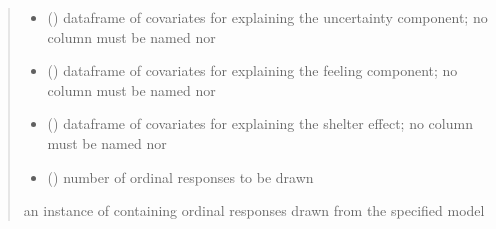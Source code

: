 \documentclass[letterpaper,10pt,english]{sphinxmanual}
\begin{document}
\begin{fulllineitems}
\begin{quote}
\begin{description}
\begin{itemize}
\item {} 
\sphinxAtStartPar
{} () \textendash{} dataframe of covariates for explaining the uncertainty component;
no column must be named  nor 

\item {} 
\sphinxAtStartPar
{} () \textendash{} dataframe of covariates for explaining the feeling component;
no column must be named  nor 

\item {} 
\sphinxAtStartPar
{} () \textendash{} dataframe of covariates for explaining the shelter effect;
no column must be named  nor 

\item {} 
\sphinxAtStartPar
{} () \textendash{} number of ordinal responses to be drawn

\end{itemize}

\sphinxAtStartPar
an instance of  containing ordinal responses drawn from the specified model

\end{description}\end{quote}

\end{fulllineitems}

\end{document}
